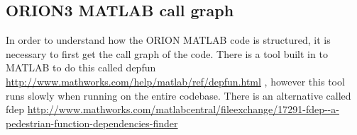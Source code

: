 
\begin{appendices}

\chapter{ORION3 MATLAB call graph}\label{appx:matlab-call-graph}

In order to understand how the ORION MATLAB code is structured, it
is necessary to first get the call graph of the code. There is a
tool built in to MATLAB to do this called
depfun
\url{http://www.mathworks.com/help/matlab/ref/depfun.html} %
, however this tool runs slowly when running on the entire codebase.
There is an alternative called fdep
\url{http://www.mathworks.com/matlabcentral/fileexchange/17291-fdep--a-pedestrian-function-dependencies-finder}


\resizebox{1.0\textwidth}{!}{}

\resizebox{1.0\textwidth}{!}{}

\resizebox{1.0\textwidth}{!}{}

\end{appendices}
